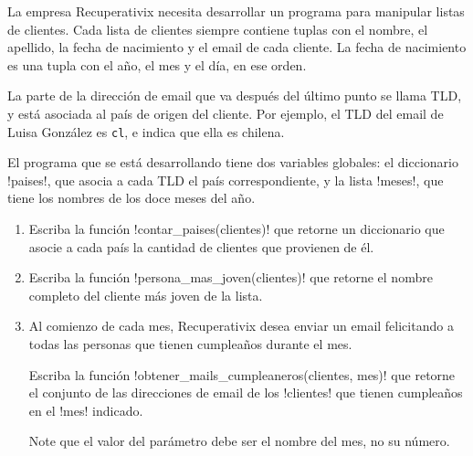 La empresa Recuperativix necesita desarrollar un programa
para manipular listas de clientes.
Cada lista de clientes siempre contiene tuplas
con el nombre, el apellido, la fecha de nacimiento y el email de cada cliente.
La fecha de nacimiento es una tupla con el año, el mes y el día, en ese orden.


La parte de la dirección de email
que va después del último punto se llama TLD,
y está asociada al país de origen del cliente.
Por ejemplo,
el TLD del email de Luisa González es \verb+cl+,
e indica que ella es chilena.

El programa que se está desarrollando
tiene dos variables globales:
el diccionario \li!paises!,
que asocia a cada TLD el país correspondiente,
y la lista \li!meses!,
que tiene los nombres de los doce meses del año.



\begin{enumerate}[leftmargin=0pt,label=\emph{\alph*})]

  \item
    Escriba la función \li!contar_paises(clientes)!
    que retorne un diccionario que asocie a cada país
    la cantidad de clientes que provienen de él.
    

  \item
    Escriba la función \li!persona_mas_joven(clientes)!
    que retorne el nombre completo
    del cliente más joven de la lista.
    

  \item
    Al comienzo de cada mes,
    Recuperativix desea enviar un email
    felicitando a todas las personas que tienen cumpleaños durante el mes.

    Escriba la función \li!obtener_mails_cumpleaneros(clientes, mes)!
    que retorne el conjunto de las direcciones de email
    de los \li!clientes! que tienen cumpleaños en el \li!mes! indicado.
    

    Note que el valor del parámetro debe ser el nombre del mes,
    no su número.

\end{enumerate}

